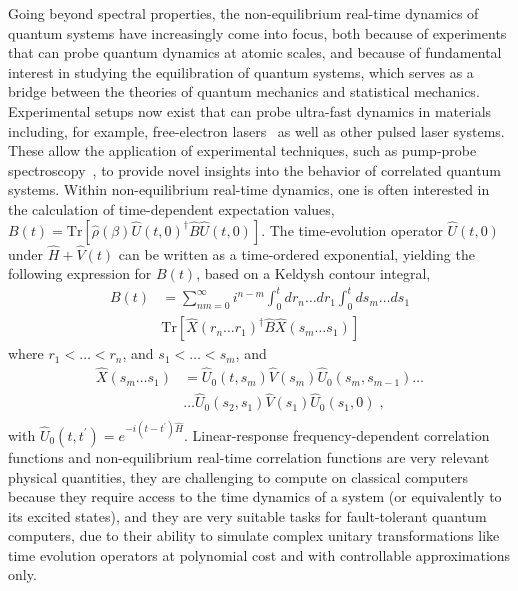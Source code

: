 Going beyond spectral properties, the {non-equilibrium real-time dynamics} of quantum systems have increasingly come into focus, both because of experiments that can probe quantum dynamics at atomic scales, 
{and because of fundamental interest in studying the equilibration of quantum systems, which serves as a bridge between the theories of quantum mechanics and statistical mechanics}. 
Experimental setups now exist that can probe ultra-fast dynamics in materials including, for example, free-electron lasers~\cite{patterson2010coherent,weathersby2015mega} as well as other pulsed laser systems. 
These allow the application of experimental techniques, such as pump-probe spectroscopy~\cite{fischer2016invited,buzzi2018probing}, to provide novel insights into the behavior of correlated quantum systems.
Within non-equilibrium real-time dynamics, one is often interested in the calculation of time-dependent expectation values, $B(t) = \mbox{Tr}[ \hat{\rho}(\beta) \hat{U}(t,0)^\dagger \hat{B} \hat{U}(t,0) ]$.
The time-evolution operator $\hat{U}(t,0)$ under $\hat{H}+\hat{V}(t)$ can be written as a time-ordered exponential, yielding the following expression for $B(t)$, based on a Keldysh contour integral,
\begin{equation}
\begin{split}
B(t) &= \sum_{nm=0}^{\infty} i^{n-m} \int_0^t dr_n \dots dr_1 \int_0^t ds_m \dots ds_1 \\
&\mbox{Tr}[ \hat{X}(r_n \dots r_1)^\dagger \hat{B} \hat{X}(s_m \dots s_1) ]
\end{split}
\end{equation}
where $r_1 < \dots <r_n$, and $s_1 < \dots <s_m$, and 
\begin{equation}
\begin{split}
\hat{X}(s_m \dots s_1) &= \hat{U}_0(t ,s_m) \hat{V}(s_m) \hat{U}_0(s_m , s_{m-1}) \dots \\
&\dots \hat{U}_0(s_2 ,s_1) \hat{V}(s_1) \hat{U}_0(s_1 ,0) \;, \\
\end{split}
\end{equation}
with $\hat{U}_0(t,t^\prime) = e^{-i (t-t^\prime) \hat{H}}$.
Linear-response frequency-dependent correlation functions and non-equilibrium real-time correlation functions are very relevant physical quantities, they are challenging to compute on classical computers because 
they require access to the time dynamics of a system (or equivalently to its excited states), and they are very suitable tasks for fault-tolerant quantum computers, due to their ability to simulate complex unitary transformations
like time evolution operators at polynomial cost and with controllable approximations only.

